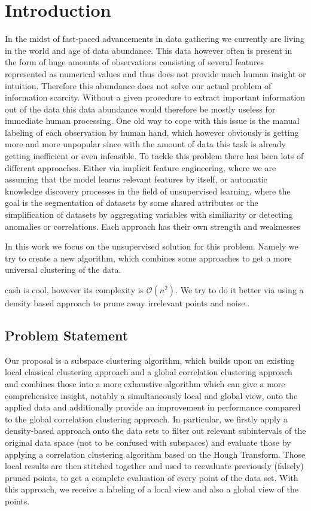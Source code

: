 \chapter{Introduction}

In the midst of fast-paced advancements in data gathering we currently are living in the world and age of data abundance. This data however often is present in the form of huge amounts of observations consisting of several features represented as numerical values and thus does not provide much human insight or intuition. Therefore this abundance does not solve our actual problem of information scarcity. Without a given procedure to extract important information out of the data this data abundance would therefore be mostly useless for immediate human processing. One old way to cope with this issue is the manual labeling of each observation by human hand, which however obviously is getting more and more unpopular since with the amount of data this task is already getting inefficient or even infeasible. %
To tackle this problem there has been lots of different approaches. Either via implicit feature engineering, where we are assuming that the model learns relevant features by itself, or automatic knowledge discovery processes in the field of unsupervised learning, where the goal is  the segmentation of datasets by some shared attributes or the simplification of datasets by aggregating variables with similiarity or detecting anomalies or correlations. Each approach has their own strength and weaknesses

In this work we focus on the unsupervised solution for this problem. Namely we try to create a new algorithm, which combines some approaches to get a more universal clustering of the data.

\acrfull{cash} is cool, however its complexity is $\mathcal{O}(n^2)$.
We try to do it better via using a density based approach to prune away irrelevant points and noise..

\section{Problem Statement}
Our proposal is a subspace clustering algorithm, which builds upon an existing local classical clustering approach and a global correlation clustering approach and combines those into a more exhaustive algorithm which can give a more comprehensive insight, notably a simultaneously local and global view, onto the applied data and additionally provide an improvement in performance compared to the global correlation clustering approach. In particular, we firstly apply a density-based approach onto the data sets to filter out relevant subintervals of the original data space (not to be confused with subspaces) and evaluate those by applying a correlation clustering algorithm based on the Hough Transform. Those local results are then stitched together and used to reevaluate previously (falsely) pruned points, to get a complete evaluation of every point of the data set. With this approach, we receive a labeling of a local view and also a global view of the points. 

